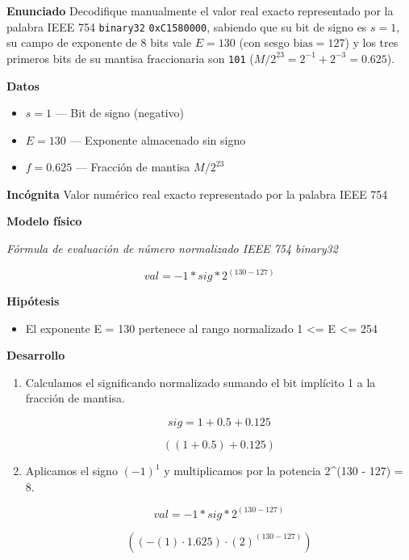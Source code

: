 \documentclass{book}
\begin{document}
\begin{tcolorbox}[title={Problema resuelto}, studiumworked, breakable]

\noindent\textbf{Enunciado}
Decodifique manualmente el valor real exacto representado por la palabra IEEE 754 \texttt{binary32} \texttt{0xC1580000}, sabiendo que su bit de signo es \(s = 1\), su campo de exponente de 8 bits vale \(E = 130\) (con sesgo \(\text{bias} = 127\)) y los tres primeros bits de su mantisa fraccionaria son \texttt{101} (\(M / 2^{23} = 2^{-1} + 2^{-3} = 0.625\)).

\noindent\textbf{Datos}
\begin{itemize}
\item $s = 1$ — Bit de signo (negativo)
\item $E = 130$ — Exponente almacenado sin signo
\item $f = 0.625$ — Fracción de mantisa \(M / 2^23\)
\end{itemize}

\noindent\textbf{Incógnita}
Valor numérico real exacto representado por la palabra IEEE 754

\noindent\textbf{Modelo físico}

\noindent\textit{Fórmula de evaluación de número normalizado IEEE 754 binary32}

\[
val = -1 * sig * 2^(130 - 127)
\]

\noindent\textbf{Hipótesis}
\begin{itemize}
\item El exponente E = 130 pertenece al rango normalizado 1 <= E <= 254
\end{itemize}

\noindent\textbf{Desarrollo}
\begin{enumerate}
\item
Calculamos el significando normalizado sumando el bit implícito 1 a la fracción de mantisa.

\[
sig = 1 + 0.5 + 0.125
\]

\[
\left(\left(1+0.5\right)+0.125\right)
\]
\item
Aplicamos el signo \((-1)^1\) y multiplicamos por la potencia 2\textasciicircum{}(130 - 127) = 8.

\[
val = -1 * sig * 2^(130 - 127)
\]

\[
\left(\left(-\left(1\right)\cdot 1.625\right)\cdot \left(2\right)^{\left(130-127\right)}\right)
\]
\end{enumerate}


\end{tcolorbox}
\end{document}
